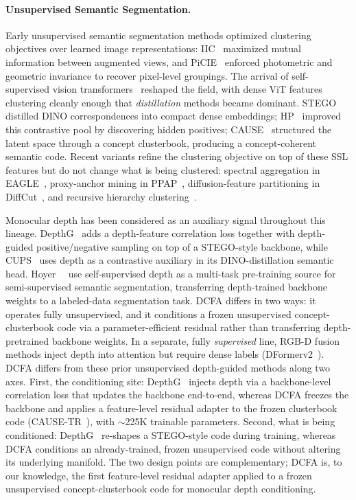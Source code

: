 \documentclass[10pt,twocolumn,letterpaper]{article}
\begin{document}
\paragraph{Unsupervised Semantic Segmentation.}
Early unsupervised semantic segmentation methods optimized clustering objectives over learned image representations: IIC~\cite{ji2019iic} maximized mutual information between augmented views, and PiCIE~\cite{cho2021picie} enforced photometric and geometric invariance to recover pixel-level groupings. The arrival of self-supervised vision transformers~\cite{caron2021dino,oquab2024dinov2} reshaped the field, with dense ViT features clustering cleanly enough that \emph{distillation} methods became dominant. STEGO~\cite{hamilton2022stego} distilled DINO correspondences into compact dense embeddings; HP~\cite{seong2023hp} improved this contrastive pool by discovering hidden positives; CAUSE~\cite{kim2024cause} structured the latent space through a concept clusterbook, producing a concept-coherent semantic code. Recent variants refine the clustering objective on top of these SSL features but do not change what is being clustered: spectral aggregation in EAGLE~\cite{kim2024eagle}, proxy-anchor mining in PPAP~\cite{seong2024ppap}, diffusion-feature partitioning in DiffCut~\cite{couairon2024diffcut}, and recursive hierarchy clustering~\cite{bonnet2024hierarchy}.

Monocular depth has been considered as an auxiliary signal throughout this lineage. DepthG~\cite{sick2024depthg} adds a depth-feature correlation loss together with depth-guided positive/negative sampling on top of a STEGO-style backbone, while CUPS~\cite{hahn2025cups} uses depth as a contrastive auxiliary in its DINO-distillation semantic head. Hoyer~\etal~\cite{hoyer2021threeways} use self-supervised depth as a multi-task pre-training source for semi-supervised semantic segmentation, transferring depth-trained backbone weights to a labeled-data segmentation task. DCFA differs in two ways: it operates fully unsupervised, and it conditions a frozen unsupervised concept-clusterbook code via a parameter-efficient residual rather than transferring depth-pretrained backbone weights. In a separate, fully \emph{supervised} line, RGB-D fusion methods inject depth into attention but require dense labels (DFormerv2~\cite{yin2025dformerv2}). DCFA differs from these prior unsupervised depth-guided methods along two axes. First, the conditioning site: DepthG~\cite{sick2024depthg} injects depth via a backbone-level correlation loss that updates the backbone end-to-end, whereas DCFA freezes the backbone and applies a feature-level residual adapter to the frozen clusterbook code (CAUSE-TR~\cite{kim2024cause}), with $\sim$225K trainable parameters. Second, what is being conditioned: DepthG~\cite{sick2024depthg} re-shapes a STEGO-style code during training, whereas DCFA conditions an already-trained, frozen unsupervised code without altering its underlying manifold. The two design points are complementary; DCFA is, to our knowledge, the first feature-level residual adapter applied to a frozen unsupervised concept-clusterbook code for monocular depth conditioning.
\end{document}
